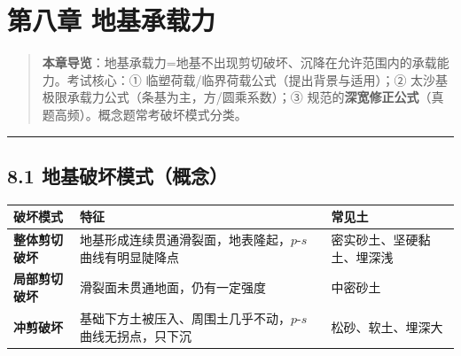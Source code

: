 \documentclass[
]{article}
\newcounter{none} %
\begin{document}
\newpage

\section{第八章
地基承载力}\label{ux7b2cux516bux7ae0-ux5730ux57faux627fux8f7dux529b}

\begin{quote}
\textbf{本章导览}：地基承载力=地基不出现剪切破坏、沉降在允许范围内的承载能力。考试核心：①
临塑荷载/临界荷载公式（提出背景与适用）；②
太沙基极限承载力公式（条基为主，方/圆乘系数）；③
规范的\textbf{深宽修正公式}（真题高频）。概念题常考破坏模式分类。
\end{quote}

\begin{center}\rule{0.5\linewidth}{0.5pt}\end{center}

\subsection{8.1
地基破坏模式（概念）}\label{ux5730ux57faux7834ux574fux6a21ux5f0fux6982ux5ff5}

{\def\LTcaptype{none} %
\begin{longtable}[]{@{}
  >{\raggedright\arraybackslash}p{}
  >{\raggedright\arraybackslash}p{}
  >{\raggedright\arraybackslash}p{}@{}}
\toprule\noalign{}
\begin{minipage}[b]{\linewidth}\raggedright
破坏模式
\end{minipage} & \begin{minipage}[b]{\linewidth}\raggedright
特征
\end{minipage} & \begin{minipage}[b]{\linewidth}\raggedright
常见土
\end{minipage} \\
\midrule\noalign{}
\endhead
\bottomrule\noalign{}
\endlastfoot
\textbf{整体剪切破坏} & 地基形成连续贯通滑裂面，地表隆起，\(p\text{-}s\)
曲线有明显陡降点 & 密实砂土、坚硬黏土、埋深浅 \\
\textbf{局部剪切破坏} & 滑裂面未贯通地面，仍有一定强度 & 中密砂土 \\
\textbf{冲剪破坏} & 基础下方土被压入、周围土几乎不动，\(p\text{-}s\)
曲线无拐点，只下沉 & 松砂、软土、埋深大 \\
\end{longtable}
}
\end{document}
